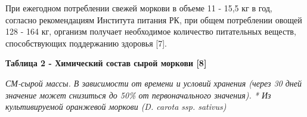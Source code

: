 При ежегодном потреблении свежей моркови в объеме 11 - 15,5 кг в год,
согласно рекомендациям Института питания РК, при общем потреблении
овощей 128 - 164 кг, организм получает необходимое количество
питательных веществ, способствующих поддержанию здоровья {[}7{]}.

{\bfseries Таблица 2 - Химический состав сырой моркови {[}8{]}}


\emph{СМ-сырой массы. В зависимости от времени и условий хранения (через
30 дней значение может снизиться до 50\% от первоначального значения). *
Из культивируемой оранжевой моркови (D. carota ssp. sativus)}

